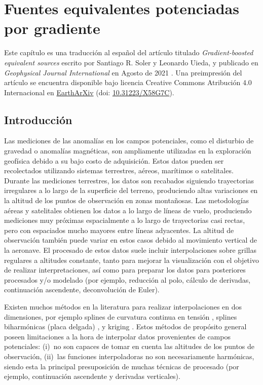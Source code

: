\chapter[Fuentes equivalentes potenciadas por gradiente]{
    Fuentes equivalentes potenciadas por gradiente
}
\label{cha:eql-gradient-boosted}

Este capítulo es una traducción al español del artículo titulado
\emph{Gradient-boosted equivalent sources} escrito por Santiago R. Soler
y Leonardo Uieda, y publicado en \emph{Geophysical Journal
International} en Agosto de 2021 \citep{soler2021}.
Una preimpresión del artículo se encuentra disponible bajo licencia Creative
Commons Atribución 4.0 Internacional en
\href{https://eartharxiv.org/}{EarthArXiv} (doi:
\href{https://doi.org/10.31223/X58G7C}{10.31223/X58G7C}).





\section{Introducción}

Las mediciones de las anomalías en los campos potenciales, como el disturbio de
gravedad o anomalías magnéticas, son ampliamente utilizadas en la exploración
geofísica debido a su bajo costo de adquisición.
Estos datos pueden ser recolectados utilizando sistemas terrestres, aéreos,
marítimos o satelitales.
Durante las mediciones terrestres, los datos son recabados siguiendo
trayectorias irregulares a lo largo de la superficie del terreno, produciendo
altas variaciones en la altitud de los puntos de observación en zonas
montañosas.
Las metodologías aéreas y satelitales obtienen los datos a lo largo de líneas
de vuelo, produciendo mediciones muy próximas espacialmente a lo largo de
trayectorias casi rectas, pero con espaciados mucho mayores entre líneas
adyacentes.
La altitud de observación también puede variar en estos casos debido al
movimiento vertical de la aeronave.
El procesado de estos datos suele incluir interpolaciones sobre grillas
regulares a altitudes constante, tanto para mejorar la visualización con el
objetivo de realizar interpretaciones, así como para preparar los datos para
posteriores procesados y/o modelado (por ejemplo, reducción al polo, cálculo de
derivadas, continuación ascendente, deconvolución de Euler).

Existen muchos métodos en la literatura para realizar interpolaciones en dos
dimensiones, por ejemplo splines de curvatura continua en tensión
\citep{smith1990}, splines biharmónicas (placa delgada) \citep{sandwell1987},
y kriging \citep{hansen1993}.
Estos métodos de propósito general poseen limitaciones a la hora de interpolar
datos provenientes de campos potenciales:
(i)~no son capaces de tomar en cuenta las altitudes de los puntos de
observación,
(ii)~las funciones interpoladoras no son necesariamente harmónicas, siendo esta
la principal presuposición de muchas técnicas de procesado (por ejemplo,
continuación ascendente y derivadas verticales).

